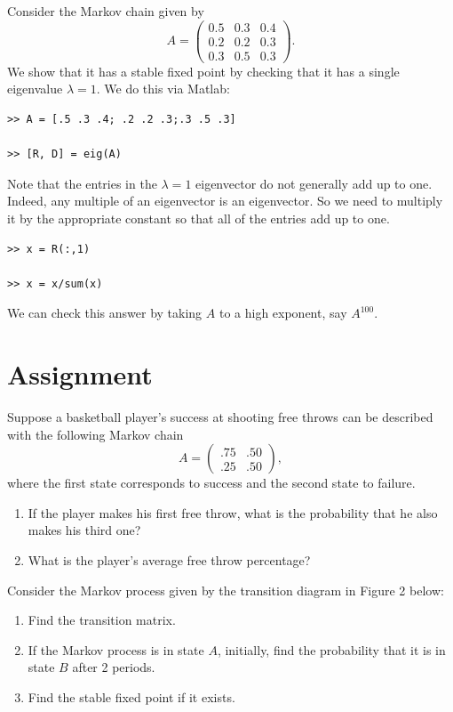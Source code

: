 Consider the Markov chain given by
\[
A = \begin{pmatrix}
0.5 & 0.3 & 0.4\\
0.2 & 0.2 & 0.3\\
0.3 & 0.5 & 0.3
\end{pmatrix}.
\]
We show that it has a stable fixed point by checking that it has a single eigenvalue $\lambda=1$.  We do this via Matlab:
\begin{verbatim}
>> A = [.5 .3 .4; .2 .2 .3;.3 .5 .3]

>> [R, D] = eig(A)
\end{verbatim}
Note that the entries in the $\lambda=1$ eigenvector do not generally add up to one.  Indeed, any multiple of an eigenvector is an eigenvector.  So we need to multiply it by the appropriate constant so that all of the entries add up to one.
\begin{verbatim}
>> x = R(:,1)

>> x = x/sum(x)
\end{verbatim}
We can check this answer by taking $A$ to a high exponent, say $A^{100}$.

\section*{Assignment}
\setcounter{problem}{0}
\begin{problem}
Suppose a basketball player's success at shooting free throws can be
described with the following Markov chain
\[
A = \begin{pmatrix}.75&.50\\.25&.50\end{pmatrix},
\]
where the first state corresponds to success and the second state to failure.
\begin{enumerate}
\item If the player makes his first free throw, what is the probability that he also makes his third one?
\item What is the player's average free throw percentage?
\end{enumerate}
\end{problem}

\begin{problem}
Consider the Markov process given by the transition diagram in Figure 2 below:
\begin{enumerate}
\item Find the transition matrix.
\item If the Markov process is in state $A$, initially, find the probability that it is in state $B$ after 2 periods.
\item Find the stable fixed point if it exists.
\end{enumerate}
\end{problem}

